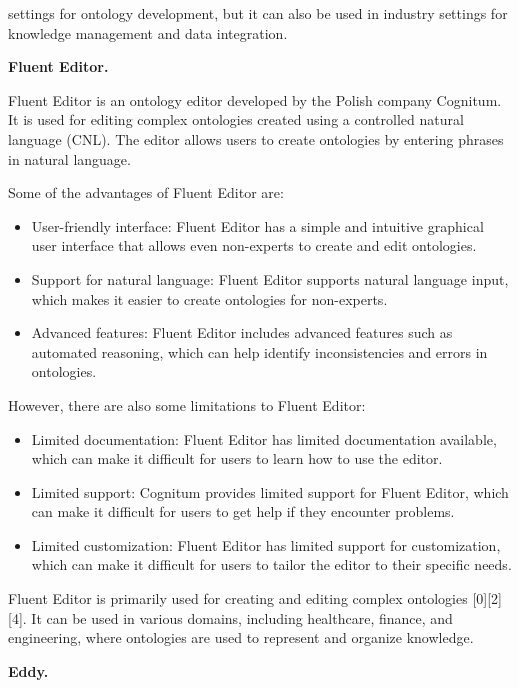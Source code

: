 \documentclass[a4paper,10pt,twocolumn]{article}
\begin{document}
settings for ontology development, but it can also be used
in industry settings for knowledge management and data
integration.

\textbf{Fluent Editor.}

Fluent Editor is an ontology editor developed by the
Polish company Cognitum. It is used for editing complex
ontologies created using a controlled natural language
(CNL). The editor allows users to create ontologies by
entering phrases in natural language.

Some of the advantages of Fluent Editor are:
\begin{itemize}
	\item{User-friendly interface: Fluent Editor has a simple
	and intuitive graphical user interface that allows
	even non-experts to create and edit ontologies.}
	\item{Support for natural language: Fluent Editor supports
	natural language input, which makes it easier to
	create ontologies for non-experts.}
	\item{Advanced features: Fluent Editor includes advanced
	features such as automated reasoning, which can
	help identify inconsistencies and errors in ontologies.}
\end{itemize}

However, there are also some limitations to Fluent
Editor:
\begin{itemize}
	\item{Limited documentation: Fluent Editor has limited
	documentation available, which can make it difficult
	for users to learn how to use the editor}.
	\item{Limited support: Cognitum provides limited support
	for Fluent Editor, which can make it difficult for
	users to get help if they encounter problems.}
	\item{Limited customization: Fluent Editor has limited
	support for customization, which can make it difficult
	for users to tailor the editor to their specific
	needs. }
\end{itemize}

Fluent Editor is primarily used for creating and editing
complex ontologies [0][2][4]. It can be used in various
domains, including healthcare, finance, and engineering,
where ontologies are used to represent and organize
knowledge.

\textbf{Eddy.}
\end{document}
